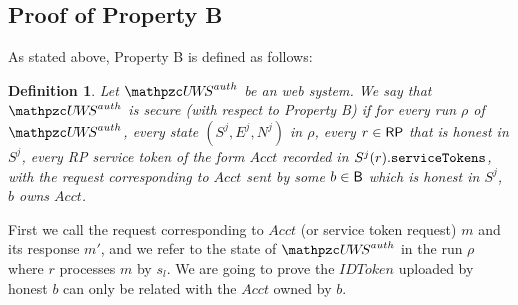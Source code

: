 \documentclass[letterpaper,onecolumn,10pt]{article}
\newtheorem{definition}{Definition}
\begin{document}
\subsection{Proof of Property B}
As stated above, Property B is defined as follows:
\begin{definition}\label{def:B}
  Let $\uppressoauthwebsystem$ be an \uppresso web system. We say that
  \emph{$\uppressoauthwebsystem$ is secure (with respect to Property B)} if
  for every run $\rho$ of $\uppressoauthwebsystem$, every state $(S^j, E^j, N^j)$
  in $\rho$, every $r\in \mathsf{RP}$ that is honest in $S^j$, 
  every RP service token of the form $Acct$ recorded in
  $S^j(r).\mathtt{serviceTokens}$, with the request corresponding to
  $Acct$ sent by some $b\in \mathsf{B}$ which is honest in $S^j$, $b$ owns $Acct$.
\end{definition}

First we call the request corresponding to $Acct$ (or service token request) $m$ and
its response $m'$, and we refer to the state of $\uppressoauthwebsystem$ in the run 
$\rho$ where $r$ processes $m$ by $s_l$. We are going to prove the $IDToken$ uploaded 
by honest $b$ can only be related with the $Acct$ owned by $b$.

\end{document}
